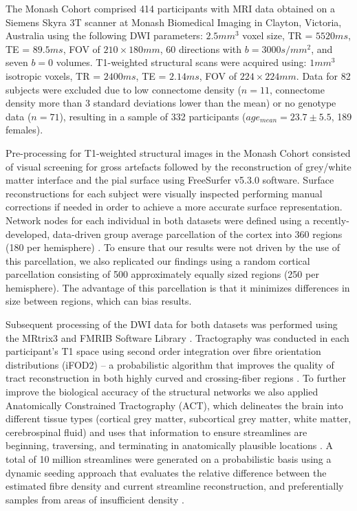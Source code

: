 The Monash Cohort comprised 414 participants with MRI data obtained on a Siemens Skyra 3T scanner at Monash Biomedical Imaging in Clayton, Victoria, Australia using the following DWI parameters: $2.5 mm^{3}$ voxel size, TR = $5520 ms$, TE = $89.5 ms$, FOV of $210 \times 180 mm$, 60 directions with $b = 3000 s/mm^{2}$, and seven $b = 0$ volumes. T1-weighted structural scans were acquired using: $1 mm^{3}$ isotropic voxels, TR = $2400 ms$, TE = $2.14 ms$, FOV of $224 \times 224 mm$. Data for 82 subjects were excluded due to low connectome density ($n = 11$, connectome density more than 3 standard deviations lower than the mean) or no genotype data ($n = 71$), resulting in a sample of 332 participants ($age_{mean} = 23.7 \pm 5.5$, 189 females). 

Pre-processing for T1-weighted structural images in the Monash Cohort consisted of visual screening for gross artefacts followed by the reconstruction of grey/white matter interface and the pial surface using FreeSurfer v5.3.0 software. Surface reconstructions for each subject were visually inspected performing manual corrections if needed in order to achieve a more accurate surface representation. Network nodes for each individual in both datasets were defined using a recently-developed, data-driven group average parcellation of the cortex into 360 regions (180 per hemisphere) \citep{Glasser2016}. To ensure that our results were not driven by the use of this parcellation, we also replicated our findings using a random cortical parcellation consisting of 500 approximately equally sized regions (250 per hemisphere). The advantage of this parcellation is that it minimizes differences in size between regions, which can bias results.

Subsequent processing of the DWI data for both datasets was performed using the MRtrix3 \citep{Tournier2012} and FMRIB Software Library \citep{Jenkinson2012}. Tractography was conducted in each participant's T1 space using second order integration over fibre orientation distributions (iFOD2) – a probabilistic algorithm that improves the quality of tract reconstruction in both highly curved and crossing-fiber regions \citep{Tournier2010}. To further improve the biological accuracy of the structural networks we also applied Anatomically Constrained Tractography (ACT), which delineates the brain into different tissue types (cortical grey matter, subcortical grey matter, white matter, cerebrospinal fluid) and uses that information to ensure streamlines are beginning, traversing, and terminating in anatomically plausible locations \citep{Smith2012}. A total of 10 million streamlines were generated on a probabilistic basis using a dynamic seeding approach that evaluates the relative difference between the estimated fibre density and current streamline reconstruction, and preferentially samples from areas of insufficient density \citep{Smith2015a}. 


